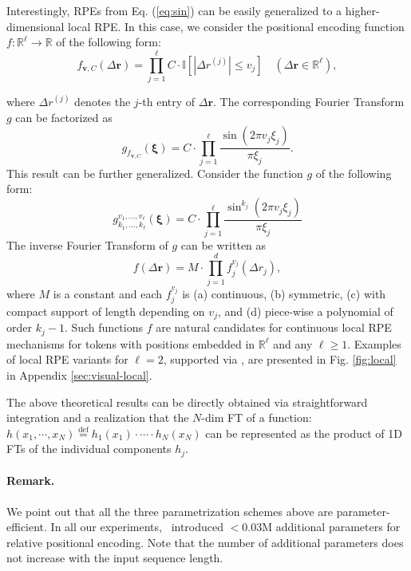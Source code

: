 Interestingly, RPEs from Eq. (\ref{eq:sin}) can be easily generalized to a higher-dimensional local RPE. In this case, we consider the positional encoding function $f:\mathbb{R}^{\ell}\to \mathbb{R}$ of the following form:
\begin{equation*}
f_{\mathbf{v}, C}(\Delta \mathbf{r}) =  \prod_{j=1}^{\ell} C \cdot \mathbb{I}[|\Delta r^{(j)}| \leq v_{j}]\quad (\Delta \mathbf{r}\in\mathbb{R}^{\ell}),
\end{equation*}

where $\Delta r^{(j)}$ denotes the $j$-th entry of $\Delta \mathbf{r}$. The corresponding Fourier Transform $g$ can be factorized as 
$$
g_{f_{\mathbf{v}, C}}(\boldsymbol{\xi}) = C \cdot \prod_{j=1}^{\ell} \frac{\sin(2\pi v_{j}\xi_{j})}{\pi \xi_{j}}.
$$
This result can be further generalized. Consider the function $g$ of the following form: 
\begin{equation*}
g_{k_{1},...,k_{\ell}}^{v_{1},...,v_{\ell}}(\boldsymbol{\xi}) = C \cdot \prod_{j=1}^{\ell} \frac{\sin^{k_{j}}(2\pi v_{j}\xi_{j})}{\pi \xi_{j}}
\end{equation*}
The inverse Fourier Transform of $g$ can be written as
$$
    f(\Delta \mathbf{r}) = M \cdot \prod_{j=1}^{d}f_{j}^{v_{j}}(\Delta r_j),
$$
where $M$ is a constant and each $f^{v_{j}}_{j}$ is (a) continuous, (b) symmetric, (c) with compact support of length depending on $v_{j}$, and (d) piece-wise a polynomial of order $k_{j}-1$.
Such functions $f$ are natural candidates for continuous local RPE mechanisms for tokens with positions embedded in $\mathbb{R}^{\ell}$ and any $\ell \geq 1$. 
Examples of local RPE variants for $\ell=2$, supported via \FLT, are presented in Fig. \ref{fig:local} in Appendix \ref{sec:visual-local}.

The above theoretical results can be directly obtained via straightforward integration and a realization that the $N$-dim FT of a function: $h(x_{1},\cdots,x_{N}) \overset{\mathrm{def}}{=} h_{1}(x_{1})\cdot\cdots\cdot h_{N}(x_{N})$ can be represented as the product of 1D FTs of the individual components $h_{j}$.

\paragraph{Remark.} We point out that all the three parametrization schemes above are parameter-efficient. In all our experiments, \FLT~introduced $<0.03$M additional parameters for relative positional encoding. Note that the number of additional parameters does not increase with the input sequence length.

